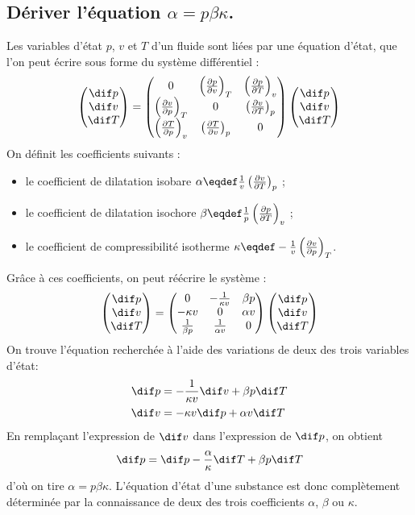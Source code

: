 \fi

\subsection{Dériver l'équation $\alpha = p\beta \kappa$.}
Les variables d'état $p$, $v$ et $T$ d'un fluide sont liées par une équation d'état, que l'on peut écrire sous forme du système différentiel :
\[
	\begin{pmatrix} \dif p \\ \dif v \\ \dif T \end{pmatrix} = 
	\begin{pmatrix}
		0 & \thermodiff{p}{v}{T} & \thermodiff{p}{T}{v} \\
		\thermodiff{v}{p}{T} & 0 & \thermodiff{v}{T}{p} \\
		\thermodiff{T}{p}{v} & \thermodiff{T}{v}{p} & 0
	\end{pmatrix}
	\begin{pmatrix} \dif p \\ \dif v \\ \dif T \end{pmatrix} 
\]
On définit les coefficients suivants :
\begin{itemize}
	\item le coefficient de dilatation isobare
		$ \alpha \eqdef \frac{1}{v} \thermodiff{v}{T}{p} $ ;
	\item le coefficient de dilatation isochore
		$ \beta \eqdef \frac{1}{p} \thermodiff{p}{T}{v} $ ;
	\item le coefficient de compressibilité isotherme
		$ \kappa \eqdef -\frac{1}{v} \thermodiff{v}{p}{T} $.
\end{itemize}
Grâce à ces coefficients, on peut réécrire le système :
\[
	\begin{pmatrix} \dif p \\ \dif v \\ \dif T \end{pmatrix} = 
	\begin{pmatrix}
		0 & -\frac{1}{\kappa v} & \beta p \\
		-\kappa v & 0 & \alpha v \\
		\frac{1}{\beta p} & \frac{1}{\alpha v} & 0
	\end{pmatrix}
	\begin{pmatrix} \dif p \\ \dif v \\ \dif T \end{pmatrix} 
\]
On trouve l'équation recherchée à l'aide des variations de deux des trois variables d'état: 
\begin{align*}
	\dif p &= -\frac{1}{\kappa v} \dif v + \beta p \dif T \\
	\dif v &= -\kappa v \dif p + \alpha v \dif T
\end{align*}
En remplaçant l'expression de $\dif v$ dans l'expression de $\dif p$, on obtient
\[ \dif p = \dif p - \frac{\alpha}{\kappa} \dif T + \beta p \dif T \]
d'où on tire $ \alpha = p \beta \kappa $.
L'équation d'état d'une substance est donc complètement déterminée par la connaissance de deux des trois coefficients $\alpha$, $\beta$ ou $\kappa$.

